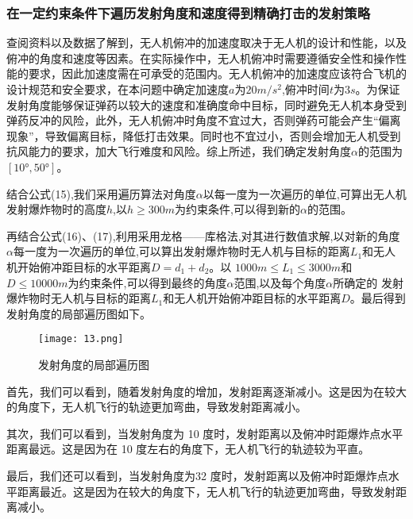 \documentclass[normalsize]{ctexart}
\begin{document}
\subsubsection{在一定约束条件下遍历发射角度和速度得到精确打击的发射策略}
查阅资料以及数据了解到，无人机俯冲的加速度取决于无人机的设计和性能，以及俯冲的角度和速度等因素。在实际操作中，无人机俯冲时需要遵循安全性和操作性能的要求，因此加速度需在可承受的范围内。无人机俯冲的加速度应该符合飞机的设计规范和安全要求，在本问题中确定加速度$a$为$20m/s^2$,俯冲时间$t$为$3s$。为保证发射角度能够保证弹药以较大的速度和准确度命中目标，同时避免无人机本身受到弹药反冲的风险，此外，无人机俯冲时角度不宜过大，否则弹药可能会产生“偏离现象”，导致偏离目标，降低打击效果。同时也不宜过小，否则会增加无人机受到抗风能力的要求，加大飞行难度和风险。综上所述，我们确定发射角度$\alpha$的范围为$[10°,50°]$。
\par 结合公式(15),我们采用遍历算法对角度$\alpha$以每一度为一次遍历的单位,可算出无人机发射爆炸物时的高度$h$,以$ h\geq300m$为约束条件,可以得到新的$\alpha$的范围。
\par 再结合公式(16)、(17),利用采用龙格——库格法,对其进行数值求解,以对新的角度$\alpha$每一度为一次遍历的单位,可以算出发射爆炸物时无人机与目标的距离$L_1$和无人机开始俯冲距目标的水平距离$D=d_1+d_2$。以
$1000m\leq L_1\le 3000 m$和$D\le
10000m$为约束条件,可以得到最终的角度$\alpha$范围,以及每个角度$\alpha$所确定的
发射爆炸物时无人机与目标的距离$L_1$和无人机开始俯冲距目标的水平距离$D$。最后得到发射角度的局部遍历图如下。
\begin{figure}[h]
	
	\centering
	\texttt{[image: 13.png]}
	\caption{发射角度的局部遍历图}
	
\end{figure}
\par
首先，我们可以看到，随着发射角度的增加，发射距离逐渐减小。这是因为在较大的角度下，无人机飞行的轨迹更加弯曲，导致发射距离减小。

其次，我们可以看到，当发射角度为 10 度时，发射距离以及俯冲时距爆炸点水平距离最远。这是因为在 10 度左右的角度下，无人机飞行的轨迹较为平直。

最后，我们还可以看到，当发射角度为32 度时，发射距离以及俯冲时距爆炸点水平距离最近。这是因为在较大的角度下，无人机飞行的轨迹更加弯曲，导致发射距离减小。
\end{document}
